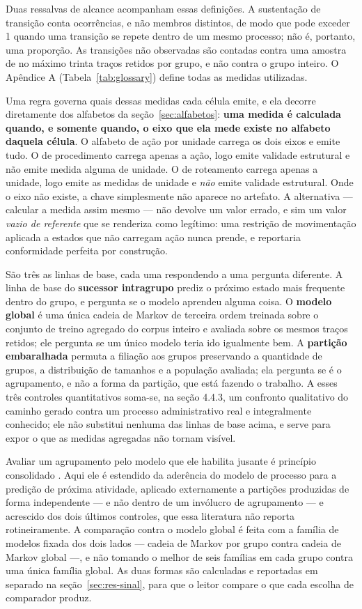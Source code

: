 Duas ressalvas de alcance acompanham essas definições. A sustentação de transição conta
ocorrências, e não membros distintos, de modo que pode exceder 1 quando uma transição se repete
dentro de um mesmo processo; não é, portanto, uma proporção. As transições não observadas são
contadas contra uma amostra de no máximo trinta traços retidos por grupo, e não contra o grupo
inteiro. O Apêndice A (Tabela~\ref{tab:glossary}) define todas as medidas utilizadas.

Uma regra governa quais dessas medidas cada célula emite, e ela decorre diretamente dos alfabetos
da seção~\ref{sec:alfabetos}: \textbf{uma medida é calculada quando, e somente quando, o eixo que
ela mede existe no alfabeto daquela célula}. O alfabeto de ação por unidade carrega os dois eixos e
emite tudo. O de procedimento carrega apenas a ação, logo emite validade estrutural e não emite
medida alguma de unidade. O de roteamento carrega apenas a unidade, logo emite as medidas de
unidade e \emph{não} emite validade estrutural. Onde o eixo não existe, a chave simplesmente não
aparece no artefato. A alternativa --- calcular a medida assim mesmo --- não devolve um valor
errado, e sim um valor \emph{vazio de referente} que se renderiza como legítimo: uma restrição de
movimentação aplicada a estados que não carregam ação nunca prende, e reportaria conformidade
perfeita por construção.

São três as linhas de base, cada uma respondendo a uma pergunta diferente. A linha de base do
\textbf{sucessor intragrupo} prediz o próximo estado mais frequente dentro do grupo, e pergunta se
o modelo aprendeu alguma coisa. O \textbf{modelo global} é uma única cadeia de Markov de terceira
ordem treinada sobre o conjunto de treino agregado do corpus inteiro e avaliada sobre os mesmos
traços retidos; ele pergunta se um único modelo teria ido igualmente bem. A \textbf{partição
embaralhada} permuta a filiação aos grupos preservando a quantidade de grupos, a distribuição de
tamanhos e a população avaliada; ela pergunta se é o agrupamento, e não a forma da partição, que
está fazendo o trabalho. A esses três controles quantitativos soma-se, na seção 4.4.3, um confronto
qualitativo do caminho gerado contra um processo administrativo real e integralmente conhecido; ele
não substitui nenhuma das linhas de base acima, e serve para expor o que as medidas agregadas não
tornam visível.

Avaliar um agrupamento pelo modelo que ele habilita jusante é princípio consolidado
\cite{deweerdt2013actitrac}. Aqui ele é estendido da aderência do modelo de processo para a predição
de próxima atividade, aplicado externamente a partições produzidas de forma independente --- e não
dentro de um invólucro de agrupamento --- e acrescido dos dois últimos controles, que essa
literatura não reporta rotineiramente. A comparação contra o modelo global é feita com a família de modelos fixada dos dois lados --- cadeia de Markov por grupo contra cadeia de Markov global ---, e não tomando o melhor de seis famílias em cada grupo contra uma única família global. As duas formas são calculadas e reportadas em separado na seção~\ref{sec:res-sinal}, para que o leitor compare o que cada escolha de comparador produz.

